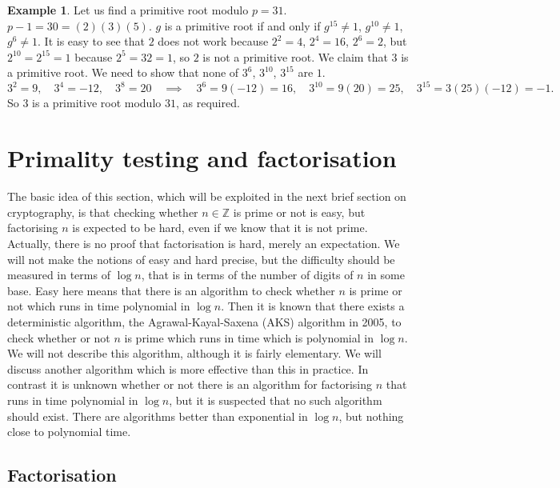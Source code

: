 \documentclass{article}
\newcommand{\Z}{\mathbb{Z}}
\newcommand{\rb}[1]{\left( #1 \right)}
\theoremstyle{definition}\newtheorem{definition}{Definition}
\theoremstyle{definition}\newtheorem*{remark}{Remark}
\theoremstyle{definition}\newtheorem*{example}{Example}
\theoremstyle{definition}\newtheorem*{note}{Note}
\begin{document}
\begin{example}
Let us find a primitive root modulo $ p = 31 $. $ p - 1 = 30 = \rb{2}\rb{3}\rb{5} $. $ g $ is a primitive root if and only if $ g^{15} \ne 1 $, $ g^{10} \ne 1 $, $ g^{6} \ne 1 $. It is easy to see that $ 2 $ does not work because $ 2^2 = 4 $, $ 2^4 = 16 $, $ 2^6 = 2 $, but $ 2^10 = 2^15 = 1 $ because $ 2^5 = 32 = 1 $, so $ 2 $ is not a primitive root. We claim that $ 3 $ is a primitive root. We need to show that none of $ 3^6 $, $ 3^{10} $, $ 3^{15} $ are $ 1 $.
$$ 3^2 = 9, \quad 3^4 = -12, \quad 3^8 = 20 \quad \implies \quad 3^6 = 9\rb{-12} = 16, \quad 3^{10} = 9\rb{20} = 25, \quad 3^{15} = 3\rb{25}\rb{-12} = -1. $$
So $ 3 $ is a primitive root modulo $ 31 $, as required.
\end{example}

\section{Primality testing and factorisation}

The basic idea of this section, which will be exploited in the next brief section on cryptography, is that checking whether $ n \in \Z $ is prime or not is easy, but factorising $ n $ is expected to be hard, even if we know that it is not prime. Actually, there is no proof that factorisation is hard, merely an expectation. We will not make the notions of easy and hard precise, but the difficulty should be measured in terms of $ \log n $, that is in terms of the number of digits of $ n $ in some base. Easy here means that there is an algorithm to check whether $ n $ is prime or not which runs in time polynomial in $ \log n $. Then it is known that there exists a deterministic algorithm, the Agrawal-Kayal-Saxena (AKS) algorithm in 2005, to check whether or not $ n $ is prime which runs in time which is polynomial in $ \log n $. We will not describe this algorithm, although it is fairly elementary. We will discuss another algorithm which is more effective than this in practice. In contrast it is unknown whether or not there is an algorithm for factorising $ n $ that runs in time polynomial in $ \log n $, but it is suspected that no such algorithm should exist. There are algorithms better than exponential in $ \log n $, but nothing close to polynomial time.

\subsection{Factorisation}
\end{document}
